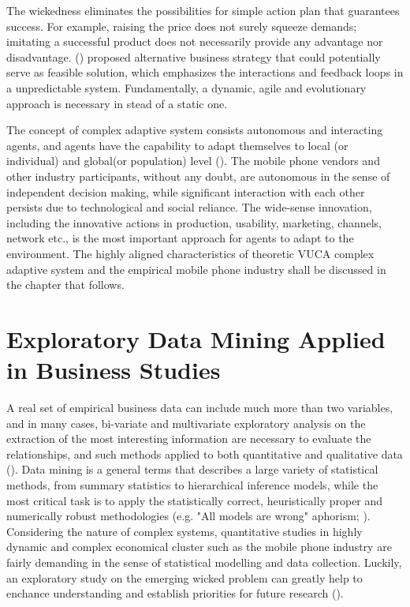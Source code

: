 \documentclass[utf8,english]{gradu3}
\begin{document}
The wickedness eliminates the possibilities for simple action plan that guarantees success. For example, raising the price does not surely squeeze demands; imitating a successful product does not necessarily provide any advantage nor disadvantage. \citeauthor{burnes2005complexity} (\citeyear{burnes2005complexity}) proposed alternative business strategy that could potentially serve as feasible solution, which emphasizes the interactions and feedback loops in a unpredictable system. Fundamentally, a dynamic, agile and evolutionary approach is necessary in stead of a static one.

The concept of complex adaptive system consists autonomous and interacting agents, and agents have the capability to adapt themselves to local (or individual) and global(or population) level (\cite{macal2010tutorial}). The mobile phone vendors and other industry participants, without any doubt, are autonomous in the sense of independent decision making, while significant interaction with each other persists due to technological and social reliance. The wide-sense innovation, including the innovative actions in production, usability, marketing, channels, network etc., is the most important approach for agents to adapt to the environment. The highly aligned characteristics of theoretic VUCA complex adaptive system and the empirical mobile phone industry shall be discussed in the chapter that follows. 

\section{Exploratory Data Mining Applied in Business Studies}

A real set of empirical business data can include much more than two variables, and in many cases, bi-variate and multivariate exploratory analysis on the extraction of the most interesting information are necessary to evaluate the relationships, and such methods applied to both quantitative and qualitative data (\cite{giudici2005applied}). Data mining is a general terms that describes a large variety of statistical methods, from summary statistics to hierarchical inference models, while the most critical task is to apply the statistically correct, heuristically proper and numerically robust methodologies (e.g. "All models are wrong" aphorism; \cite{box1979robustness}). Considering the nature of complex systems, quantitative studies in highly dynamic and complex economical cluster such as the mobile phone industry are fairly demanding in the sense of statistical modelling and data collection. Luckily, an exploratory study on the emerging wicked problem can greatly help to enchance understanding and establish priorities for future research (\cite{shields2013playbook}).
\end{document}

